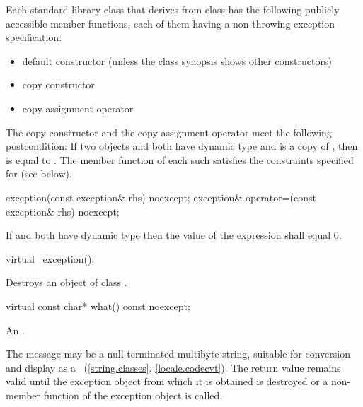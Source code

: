 \pnum
Each standard library class  that derives from class 
has the following publicly accessible member functions, each of them having
a non-throwing exception specification:
\begin{itemize}
\item default constructor (unless the class synopsis shows other constructors)
\item copy constructor
\item copy assignment operator
\end{itemize}
The copy constructor and the copy assignment operator meet
the following postcondition: If two objects  and  both have
dynamic type  and  is a copy of , then
 is equal to .
The  member function of each such  satisfies the
constraints specified for  (see below).

%
%
\begin{itemdecl}
exception(const exception& rhs) noexcept;
exception& operator=(const exception& rhs) noexcept;
\end{itemdecl}

\begin{itemdescr}
\pnum
\ensures
If  and  both have dynamic type 
then the value of the expression  shall equal 0.
\end{itemdescr}

%
\begin{itemdecl}
virtual ~exception();
\end{itemdecl}

\begin{itemdescr}
\pnum
\effects
Destroys an object of class
.
\end{itemdescr}

%
\begin{itemdecl}
virtual const char* what() const noexcept;
\end{itemdecl}

\begin{itemdescr}
\pnum
\returns
An  \ntbs{}.

\pnum
\remarks
The message may be a null-terminated multibyte string,
suitable for conversion and display as a
~(\ref{string.classes}, \ref{locale.codecvt}).
The return value remains valid until the exception object from which
it is obtained is destroyed or a non-
member function of the exception object is called.
\end{itemdescr}

